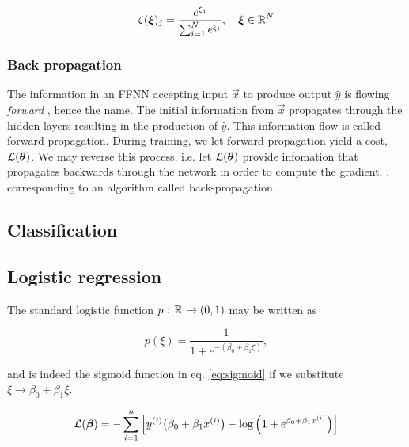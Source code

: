     \begin{equation}\label{eq:softmax}
        \zeta(\svec{\xi})_j = \frac{e^{\xi_j}}{\sum\nolimits_{i=1}^{N}e^{\xi_i}}, \quad \svec{\xi} \in \RR[N]
    \end{equation}





    \subsubsection{Back propagation}\label{sec:back_propagation}


    The information in an FFNN accepting input $\vec{x}$ to produce output $\hat{y}$  is flowing \textit{forward} \citep{Goodfellow2016}, hence the name. The initial information from $\vec{x}$ propagates through the hidden layers resulting in the production of $\hat{y}$. This information flow is called forward propagation. During training, we let forward propagation yield a cost, $\mathcal{L}(\svec{\theta})$. We may reverse this process, i.e. let $\mathcal{L}(\svec{\theta})$ provide infomation that propagates backwards through the network in order to compute the gradient, , corresponding to an algorithm called back-propagation.


\subsection{Classification}\label{sec:classification}

\subsection{Logistic regression}\label{sec:logistic_regression}

The standard logistic function $p:\, \RR \to (0,1)$ may be written as 

\begin{equation}\label{eq:logistic_function}
    p(\xi) = \frac{1}{1+e^{-(\beta_0 + \beta_1\xi)}},
\end{equation}

and is indeed the sigmoid function in eq. \eqref{eq:sigmoid} if we substitute $\xi \to \beta_0 + \beta_1 \xi$.


\begin{equation}\label{eq:logistic_cost_function}
    \mathcal{L}(\svec{\beta}) = - \sum_{i=1}^n \Big[ y^{(i)} \big(\beta_0+ \beta_1 x^{(i)}\big) - \log{\Big(1+e^{\beta_0 + \beta_1 x^{(i)}}\Big)} \Big]
\end{equation}